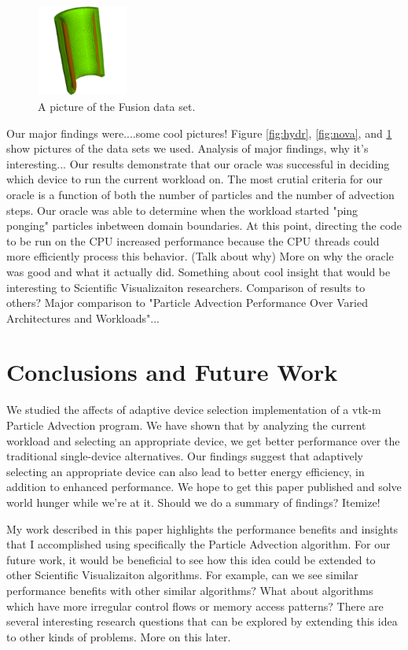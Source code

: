 \documentclass{IEEEtran}
\begin{document}
%
\begin{figure}
  \includegraphics[width=3cm]{images/Fusion.png}
  \caption{A picture of the Fusion data set.}
  \label{fig:fus}
\end{figure}
%
Our major findings were....some cool pictures! 
%
Figure \ref{fig:hydr}, \ref{fig:nova}, and \ref{fig:fus} show pictures of the data sets we used.
%
Analysis of major findings, why it's interesting...
%
Our results demonstrate that our oracle was successful in deciding which device to run the current workload on.
%
The most crutial criteria for our oracle is a function of both the number of particles and the number of advection steps.
%
Our oracle was able to determine when the workload started "ping ponging" particles inbetween domain boundaries.
%
At this point, directing the code to be run on the CPU increased performance because the CPU threads could more efficiently process this behavior. (Talk about why)
%
More on why the oracle was good and what it actually did.
%
Something about cool insight that would be interesting to Scientific Visualizaiton researchers.
%
Comparison of results to others? 
%
Major comparison to "Particle Advection Performance Over Varied Architectures and Workloads"...
%
\section{Conclusions and Future Work}
We studied the affects of adaptive device selection implementation of a vtk-m Particle Advection program. 
%
We have shown that by analyzing the current workload and selecting an appropriate device, we get better performance over the traditional single-device alternatives. 
%
Our findings suggest that adaptively selecting an appropriate device can also lead to better energy efficiency, in addition to enhanced performance. 
%
We hope to get this paper published and solve world hunger while we're at it.
%
Should we do a summary of findings? Itemize!

My work described in this paper highlights the performance benefits and insights that I accomplished using specifically the Particle Advection algorithm.
%
For our future work, it would be beneficial to see how this idea could be extended to other Scientific Visualizaiton algorithms.
%
For example, can we see similar performance benefits with other similar algorithms?
%
What about algorithms which have more irregular control flows or memory access patterns?
%
There are several interesting research questions that can be explored by extending this idea to other kinds of problems.
%
More on this later.
%
\end{document}
